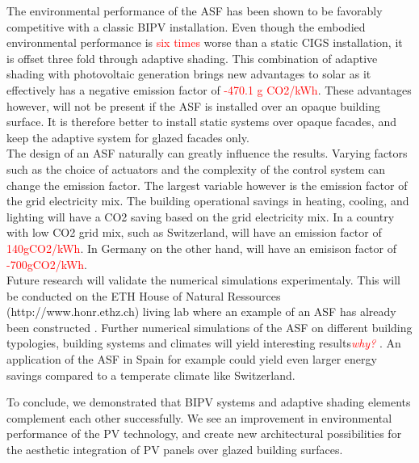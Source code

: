 
The environmental performance of the ASF has been shown to be favorably competitive with a classic BIPV installation. Even though the embodied environmental performance is \textcolor{red}{six times} worse than a static CIGS installation, it is offset three fold through adaptive shading. This combination of adaptive shading with photovoltaic generation brings new advantages to solar as it effectively has a negative emission factor of \textcolor{red}{-470.1 g CO2/kWh}. These advantages however, will not be present if the ASF is installed over an opaque building surface. It is therefore better to install static systems over opaque facades, and keep the adaptive system for glazed facades only. \\

The design of an ASF naturally can greatly influence the results. Varying factors such as the choice of actuators and the complexity of the control system can change the emission factor. The largest variable however is the emission factor of the grid electricity mix. The building operational savings in heating, cooling, and lighting will have a CO2 saving based on the grid electricity mix. In a country with low CO2 grid mix, such as Switzerland, will have an emission factor of \textcolor{red}{140gCO2/kWh}. In Germany on the other hand, will have an emisison factor of \textcolor{red}{-700gCO2/kWh}.\\

Future research will validate the numerical simulations experimentaly. This will be conducted on the ETH House of Natural Ressources (http://www.honr.ethz.ch) living lab where an example of an ASF has already been constructed \cite{nagy2015frontiers}. Further numerical simulations of the ASF on different building typologies, building systems and climates will yield interesting results\textcolor{red}{\textit{why?}} . An application of the ASF in Spain for example could yield even larger energy savings compared to a temperate climate like Switzerland.

To conclude, we demonstrated that BIPV systems and adaptive shading elements complement each other successfully. We see an improvement in environmental performance of the PV technology, and create new architectural possibilities for the aesthetic integration of PV panels over glazed building surfaces. 



